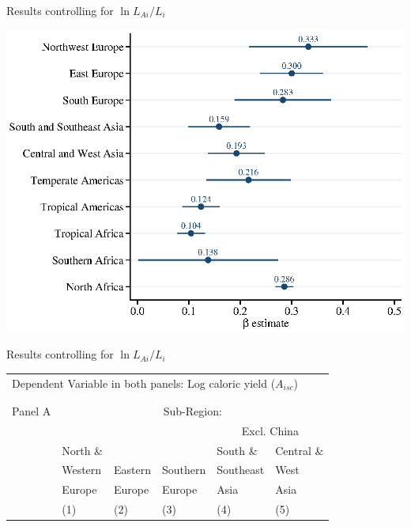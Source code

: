 \documentclass[10pt, xcolor=dvipsnames]{beamer}
\begin{document}
\begin{frame}{Results controlling for $\ln L_{Ai}/L_i$}
\begin{center}
\includegraphics[width=.8\textwidth]{fig_coef_subregion_autarky.eps}
\end{center}
\hfill \hyperlink{robustness}{}
\end{frame}

\begin{frame}{Results controlling for $\ln L_{Ai}/L_i$}

{\scriptsize
\begin{tabularx}{\textwidth}{lXXXXX}
\midrule
\multicolumn{6}{l}{Dependent Variable in both panels: Log caloric yield ($A_{isc}$)} \\ \\
\\
Panel A & \multicolumn{5}{c}{Sub-Region:} \\ \cmidrule{2-6}
 &          &         &             &  \multicolumn{2}{c}{Excl. China} \\ \cmidrule(lr){5-6}
 & North \& &         &              & South \&  & Central \&             \\
 & Western  & Eastern & Southern     & Southeast & West        \\
 & Europe   & Europe  & Europe       & Asia      & Asia      \\
 & (1) & (2) & (3) & (4) & (5) \\
\midrule

\midrule
\end{tabularx}
}

\end{frame}
\end{document}
